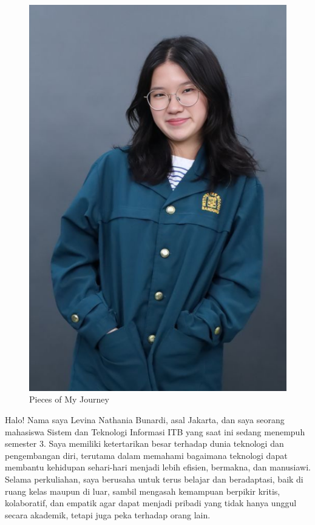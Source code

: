 \documentclass[
  letterpaper,
  DIV=11,
  numbers=noendperiod]{scrreprt}
\begin{document}
\begin{figure}[H]

{\centering \includegraphics[width=3\linewidth,height=\textheight,keepaspectratio]{All_About_me/../images/Foto_18224057_Levina Nathania Bunardi.png}

}

\caption{Pieces of My Journey}

\end{figure}%

Halo! Nama saya Levina Nathania Bunardi, asal Jakarta, dan saya seorang
mahasiswa Sistem dan Teknologi Informasi ITB yang saat ini sedang
menempuh semester 3. Saya memiliki ketertarikan besar terhadap dunia
teknologi dan pengembangan diri, terutama dalam memahami bagaimana
teknologi dapat membantu kehidupan sehari-hari menjadi lebih efisien,
bermakna, dan manusiawi. Selama perkuliahan, saya berusaha untuk terus
belajar dan beradaptasi, baik di ruang kelas maupun di luar, sambil
mengasah kemampuan berpikir kritis, kolaboratif, dan empatik agar dapat
menjadi pribadi yang tidak hanya unggul secara akademik, tetapi juga
peka terhadap orang lain.
\end{document}
